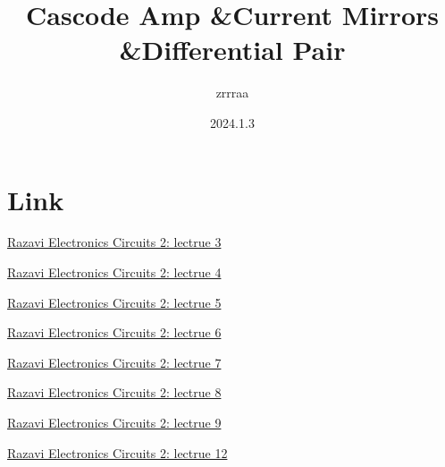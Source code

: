 \documentclass[fontset=windows]{article}
\title{\heiti\zihao{2} Cascode Amp \&Current Mirrors \&Differential Pair \uppercase\expandafter{\romannumeral1}}
\author{\songti zrrraa}
\date{2024.1.3}
\begin{document}
\maketitle
\thispagestyle{empty}



\section*{Link}

\href{https://www.bilibili.com/video/BV1Ef4y167SN?p=3&vd_source=1d0c07486a3bd3b0adb8ac548bf6453e}{Razavi Electronics Circuits 2: lectrue 3}

\href{https://www.bilibili.com/video/BV1Ef4y167SN?p=4&vd_source=1d0c07486a3bd3b0adb8ac548bf6453e}{Razavi Electronics Circuits 2: lectrue 4}

\href{https://www.bilibili.com/video/BV1Ef4y167SN?p=5&vd_source=1d0c07486a3bd3b0adb8ac548bf6453e}{Razavi Electronics Circuits 2: lectrue 5}

\href{https://www.bilibili.com/video/BV1Ef4y167SN?p=6&vd_source=1d0c07486a3bd3b0adb8ac548bf6453e}{Razavi Electronics Circuits 2: lectrue 6}

\href{https://www.bilibili.com/video/BV1Ef4y167SN?p=6&vd_source=1d0c07486a3bd3b0adb8ac548bf6453e}{Razavi Electronics Circuits 2: lectrue 7}

\href{https://www.bilibili.com/video/BV1Ef4y167SN?p=7&vd_source=1d0c07486a3bd3b0adb8ac548bf6453e}{Razavi Electronics Circuits 2: lectrue 8}

\href{https://www.bilibili.com/video/BV1Ef4y167SN?p=8&vd_source=1d0c07486a3bd3b0adb8ac548bf6453e}{Razavi Electronics Circuits 2: lectrue 9}

\href{https://www.bilibili.com/video/BV1Ef4y167SN?p=12&vd_source=1d0c07486a3bd3b0adb8ac548bf6453e}{Razavi Electronics Circuits 2: lectrue 12}
\end{document}
